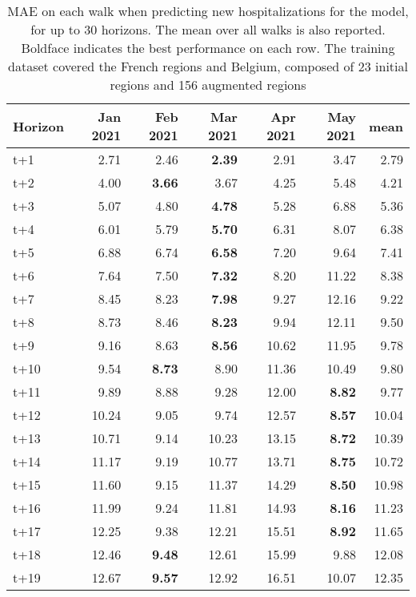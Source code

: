 \begin{table}[H]
\centering
\caption{MAE on each walk when predicting new hospitalizations for the model, for up to 30 horizons. The mean over all walks is also reported. Boldface indicates the best performance on each row. The training dataset covered the French regions and Belgium, composed of 23 initial regions and 156 augmented regions }
\label{tab:MAE_walk_baseline}
\begin{tabular}{lrrrrrr}
\toprule
Horizon &  Jan 2021 &  Feb 2021 &  Mar 2021 &  Apr 2021 &  May 2021 &  mean \\
\midrule
t+1  & 2.71  & 2.46  & \textbf{2.39}  & 2.91  & 3.47  & 2.79  \\
t+2  & 4.00  & \textbf{3.66}  & 3.67  & 4.25  & 5.48  & 4.21  \\
t+3  & 5.07  & 4.80  & \textbf{4.78}  & 5.28  & 6.88  & 5.36  \\
t+4  & 6.01  & 5.79  & \textbf{5.70}  & 6.31  & 8.07  & 6.38  \\
t+5  & 6.88  & 6.74  & \textbf{6.58}  & 7.20  & 9.64  & 7.41  \\
t+6  & 7.64  & 7.50  & \textbf{7.32}  & 8.20  & 11.22  & 8.38  \\
t+7  & 8.45  & 8.23  & \textbf{7.98}  & 9.27  & 12.16  & 9.22  \\
t+8  & 8.73  & 8.46  & \textbf{8.23}  & 9.94  & 12.11  & 9.50  \\
t+9  & 9.16  & 8.63  & \textbf{8.56}  & 10.62  & 11.95  & 9.78  \\
t+10  & 9.54  & \textbf{8.73}  & 8.90  & 11.36  & 10.49  & 9.80  \\
t+11  & 9.89  & 8.88  & 9.28  & 12.00  & \textbf{8.82}  & 9.77  \\
t+12  & 10.24  & 9.05  & 9.74  & 12.57  & \textbf{8.57}  & 10.04  \\
t+13  & 10.71  & 9.14  & 10.23  & 13.15  & \textbf{8.72}  & 10.39  \\
t+14  & 11.17  & 9.19  & 10.77  & 13.71  & \textbf{8.75}  & 10.72  \\
t+15  & 11.60  & 9.15  & 11.37  & 14.29  & \textbf{8.50}  & 10.98  \\
t+16  & 11.99  & 9.24  & 11.81  & 14.93  & \textbf{8.16}  & 11.23  \\
t+17  & 12.25  & 9.38  & 12.21  & 15.51  & \textbf{8.92}  & 11.65  \\
t+18  & 12.46  & \textbf{9.48}  & 12.61  & 15.99  & 9.88  & 12.08  \\
t+19  & 12.67  & \textbf{9.57}  & 12.92  & 16.51  & 10.07  & 12.35  \\

\end{tabular}
\end{table}
